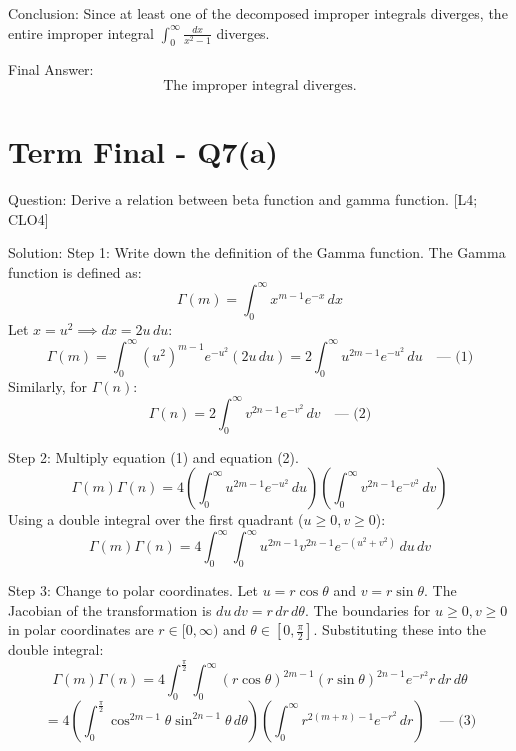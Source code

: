 \documentclass[11pt, a4paper]{article}
\begin{document}
Conclusion:
Since at least one of the decomposed improper integrals diverges, the entire improper integral $\int_{0}^{\infty} \frac{dx}{x^2 - 1}$ diverges.

Final Answer:
\[
\boxed{\text{The improper integral diverges.}}
\]





\section*{Term Final - Q7(a)}

Question:
Derive a relation between beta function and gamma function. [L4; CLO4]

Solution:
Step 1: Write down the definition of the Gamma function.
The Gamma function is defined as:
\[
\Gamma(m) = \int_{0}^{\infty} x^{m-1} e^{-x} \, dx
\]
Let $x = u^2 \implies dx = 2u \, du$:
\[
\Gamma(m) = \int_{0}^{\infty} (u^2)^{m-1} e^{-u^2} (2u \, du) = 2 \int_{0}^{\infty} u^{2m-1} e^{-u^2} \, du \quad \text{--- (1)}
\]
Similarly, for $\Gamma(n)$:
\[
\Gamma(n) = 2 \int_{0}^{\infty} v^{2n-1} e^{-v^2} \, dv \quad \text{--- (2)}
\]

Step 2: Multiply equation (1) and equation (2).
\[
\Gamma(m)\Gamma(n) = 4 \left( \int_{0}^{\infty} u^{2m-1} e^{-u^2} \, du \right) \left( \int_{0}^{\infty} v^{2n-1} e^{-v^2} \, dv \right)
\]
Using a double integral over the first quadrant ($u \ge 0, v \ge 0$):
\[
\Gamma(m)\Gamma(n) = 4 \int_{0}^{\infty} \int_{0}^{\infty} u^{2m-1} v^{2n-1} e^{-(u^2 + v^2)} \, du \, dv
\]

Step 3: Change to polar coordinates.
Let $u = r \cos \theta$ and $v = r \sin \theta$. The Jacobian of the transformation is $du \, dv = r \, dr \, d\theta$.
The boundaries for $u \ge 0, v \ge 0$ in polar coordinates are $r \in [0, \infty)$ and $\theta \in [0, \frac{\pi}{2}]$.
Substituting these into the double integral:
\[
\Gamma(m)\Gamma(n) = 4 \int_{0}^{\frac{\pi}{2}} \int_{0}^{\infty} (r \cos \theta)^{2m-1} (r \sin \theta)^{2n-1} e^{-r^2} r \, dr \, d\theta
\]
\[
= 4 \left( \int_{0}^{\frac{\pi}{2}} \cos^{2m-1}\theta \sin^{2n-1}\theta \, d\theta \right) \left( \int_{0}^{\infty} r^{2(m+n)-1} e^{-r^2} \, dr \right) \quad \text{--- (3)}
\]
\end{document}
